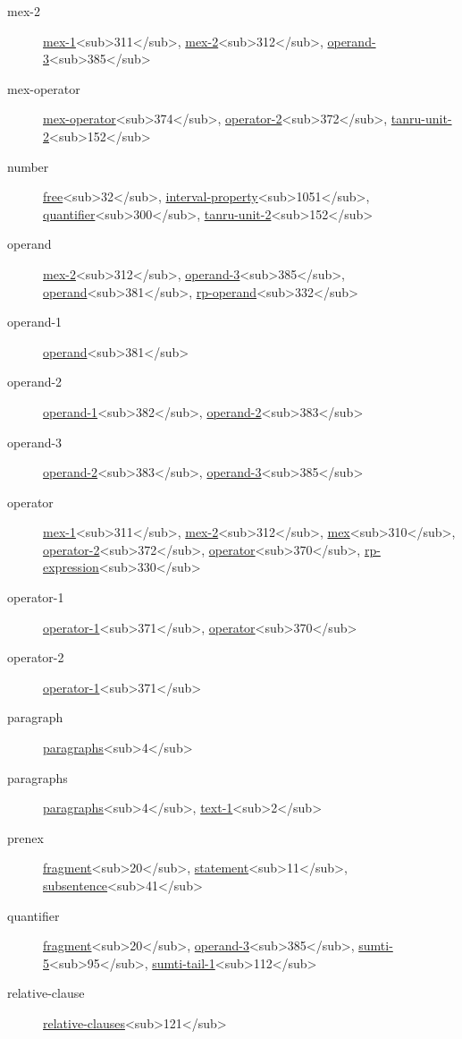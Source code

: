 \begin{description}
\item[mex-2] \hyperref[html:b311]{mex-1}<sub>311</sub>, \hyperref[html:b312]{mex-2}<sub>312</sub>, \hyperref[html:b385]{operand-3}<sub>385</sub>
\item[mex-operator] \hyperref[html:b374]{mex-operator}<sub>374</sub>, \hyperref[html:b372]{operator-2}<sub>372</sub>, \hyperref[html:b152]{tanru-unit-2}<sub>152</sub>
\item[number] \hyperref[html:b32]{free}<sub>32</sub>, \hyperref[html:b1051]{interval-property}<sub>1051</sub>, \hyperref[html:b300]{quantifier}<sub>300</sub>, \hyperref[html:b152]{tanru-unit-2}<sub>152</sub>
\item[operand] \hyperref[html:b312]{mex-2}<sub>312</sub>, \hyperref[html:b385]{operand-3}<sub>385</sub>, \hyperref[html:b381]{operand}<sub>381</sub>, \hyperref[html:b332]{rp-operand}<sub>332</sub>
\item[operand-1] \hyperref[html:b381]{operand}<sub>381</sub>
\item[operand-2] \hyperref[html:b382]{operand-1}<sub>382</sub>, \hyperref[html:b383]{operand-2}<sub>383</sub>
\item[operand-3] \hyperref[html:b383]{operand-2}<sub>383</sub>, \hyperref[html:b385]{operand-3}<sub>385</sub>
\item[operator] \hyperref[html:b311]{mex-1}<sub>311</sub>, \hyperref[html:b312]{mex-2}<sub>312</sub>, \hyperref[html:b310]{mex}<sub>310</sub>, \hyperref[html:b372]{operator-2}<sub>372</sub>, \hyperref[html:b370]{operator}<sub>370</sub>, \hyperref[html:b330]{rp-expression}<sub>330</sub>
\item[operator-1] \hyperref[html:b371]{operator-1}<sub>371</sub>, \hyperref[html:b370]{operator}<sub>370</sub>
\item[operator-2] \hyperref[html:b371]{operator-1}<sub>371</sub>
\item[paragraph] \hyperref[html:b4]{paragraphs}<sub>4</sub>
\item[paragraphs] \hyperref[html:b4]{paragraphs}<sub>4</sub>, \hyperref[html:b2]{text-1}<sub>2</sub>
\item[prenex] \hyperref[html:b20]{fragment}<sub>20</sub>, \hyperref[html:b11]{statement}<sub>11</sub>, \hyperref[html:b41]{subsentence}<sub>41</sub>
\item[quantifier] \hyperref[html:b20]{fragment}<sub>20</sub>, \hyperref[html:b385]{operand-3}<sub>385</sub>, \hyperref[html:b95]{sumti-5}<sub>95</sub>, \hyperref[html:b112]{sumti-tail-1}<sub>112</sub>
\item[relative-clause] \hyperref[html:b121]{relative-clauses}<sub>121</sub>

\end{description}

